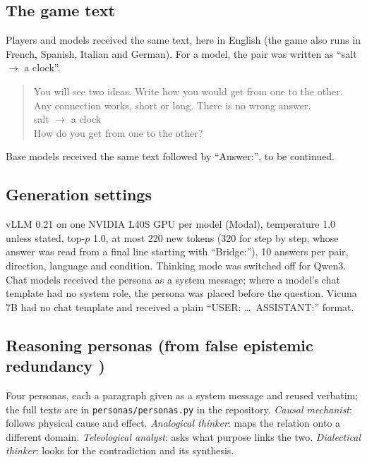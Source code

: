 \subsection*{The game text}
Players and models received the same text, here in English (the game also runs in French, Spanish, Italian and German). For a model, the pair was written as ``salt $\to$ a clock''.
\begin{quote}\small You will see two ideas. Write how you would get from one to the other. Any connection works, short or long. There is no wrong answer.\\[0.3em] salt $\to$ a clock \\[0.3em] How do you get from one to the other?\end{quote}
Base models received the same text followed by ``Answer:'', to be continued.
\subsection*{Generation settings}
vLLM 0.21 on one NVIDIA L40S GPU per model (Modal), temperature 1.0 unless stated, top-$p$ 1.0, at most 220 new tokens (320 for step by step, whose answer was read from a final line starting with ``Bridge:''), 10 answers per pair, direction, language and condition. Thinking mode was switched off for Qwen3. Chat models received the persona as a system message; where a model's chat template had no system role, the persona was placed before the question. Vicuna 7B had no chat template and received a plain ``USER: \dots\ ASSISTANT:'' format.
\subsection*{Reasoning personas (from false epistemic redundancy \citep{gallego2026fer})}
Four personas, each a paragraph given as a system message and reused verbatim; the full texts are in \texttt{personas/personas.py} in the repository. \emph{Causal mechanist}: follows physical cause and effect. \emph{Analogical thinker}: maps the relation onto a different domain. \emph{Teleological analyst}: asks what purpose links the two. \emph{Dialectical thinker}: looks for the contradiction and its synthesis.
